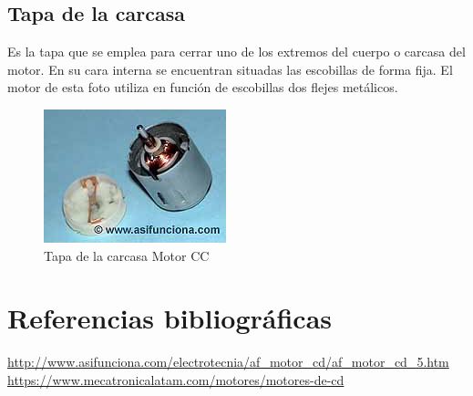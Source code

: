 \documentclass[12pt,a4paper]{article}
\begin{document}
\subsection*{Tapa de la carcasa}
Es la tapa que se emplea para cerrar uno de los extremos del cuerpo o carcasa del motor. En su cara interna se encuentran situadas las escobillas de forma fija. El motor de esta foto utiliza en función de escobillas dos flejes metálicos.
\begin{figure}[hbtp]
\centering
\includegraphics[scale=0.6]{Circuitos/tapa.jpg}
\caption{Tapa de la carcasa Motor CC}
\end{figure}

\section{Referencias bibliográficas}
\url{http://www.asifunciona.com/electrotecnia/af_motor_cd/af_motor_cd_5.htm}\\
\url{https://www.mecatronicalatam.com/motores/motores-de-cd}\\
\end{document}
